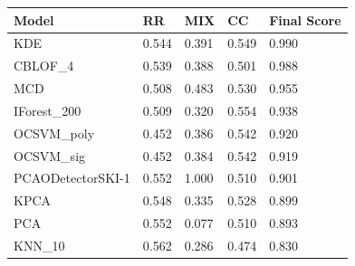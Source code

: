 \begin{table}[]
\begin{tabular}{|l|l|l|l|l|}
\hline
\textbf{Model}    & \textbf{RR} & \textbf{MIX} & \textbf{CC} & \textbf{Final Score} \\ \hline
KDE               & 0.544       & 0.391        & 0.549       & 0.990                \\ \hline
CBLOF\_4          & 0.539       & 0.388        & 0.501       & 0.988                \\ \hline
MCD               & 0.508       & 0.483        & 0.530       & 0.955                \\ \hline
IForest\_200      & 0.509       & 0.320        & 0.554       & 0.938                \\ \hline
OCSVM\_poly       & 0.452       & 0.386        & 0.542       & 0.920                \\ \hline
OCSVM\_sig        & 0.452       & 0.384        & 0.542       & 0.919                \\ \hline
PCAODetectorSKI-1 & 0.552       & 1.000        & 0.510       & 0.901                \\ \hline
KPCA              & 0.548       & 0.335        & 0.528       & 0.899                \\ \hline
PCA               & 0.552       & 0.077        & 0.510       & 0.893                \\ \hline
KNN\_10           & 0.562       & 0.286        & 0.474       & 0.830                \\ \hline
\end{tabular}
\end{table}
